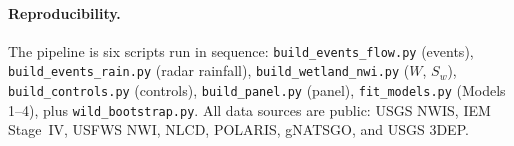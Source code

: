 \documentclass[11pt]{article}
\begin{document}
\paragraph{Reproducibility.} The pipeline is six scripts run in sequence:
\texttt{build\_events\_flow.py} (events), \texttt{build\_events\_rain.py} (radar rainfall),
\texttt{build\_wetland\_nwi.py} ($W$, $S_w$), \texttt{build\_controls.py} (controls),
\texttt{build\_panel.py} (panel), \texttt{fit\_models.py} (Models 1--4), plus
\texttt{wild\_bootstrap.py}. All data sources are public: USGS NWIS, IEM Stage~IV, USFWS NWI,
NLCD, POLARIS, gNATSGO, and USGS 3DEP.
\end{document}
